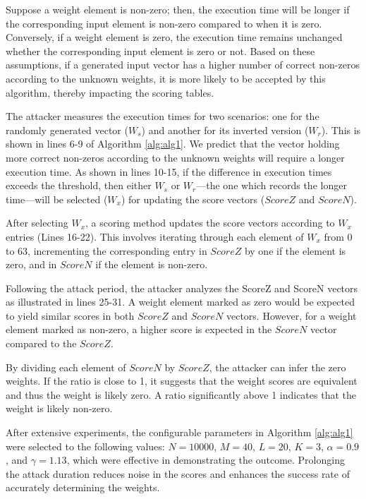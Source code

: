 Suppose a weight element is non-zero; then, the execution time will be longer if the corresponding input element is non-zero compared to when it is zero. Conversely, if a weight element is zero, the execution time remains unchanged whether the corresponding input element is zero or not. Based on these assumptions, if a generated input vector has a higher number of correct non-zeros according to the unknown weights, it is more likely to be accepted by this algorithm, thereby impacting the scoring tables.

The attacker measures the execution times for two scenarios: one for the randomly generated vector (\(W_s\)) and another for its inverted version (\(W_r\)). This is shown in lines 6-9 of Algorithm \ref{alg:alg1}. We predict that the vector holding more correct non-zeros according to the unknown weights will require a longer execution time. As shown in lines 10-15, if the difference in execution times exceeds the threshold, then either \(W_s\) or \(W_r\)—the one which records the longer time—will be selected (\(W_x\)) for updating the score vectors (\(ScoreZ\) and \(ScoreN\)). 

After selecting \(W_x\), a scoring method updates the score vectors according to \(W_x\) entries (Lines 16-22). This involves iterating through each element of \(W_x\) from 0 to 63, incrementing the corresponding entry in \(ScoreZ\) by one if the element is zero, and in \(ScoreN\) if the element is non-zero.

Following the attack period, the attacker analyzes the ScoreZ and ScoreN vectors as illustrated in lines 25-31. A weight element marked as zero would be expected to yield similar scores in both \(ScoreZ\) and \(ScoreN\) vectors. However, for a weight element marked as non-zero, a higher score is expected in the \(ScoreN\) vector compared to the \(ScoreZ\).

By dividing each element of \(ScoreN\) by \(ScoreZ\), the attacker can infer the zero weights. If the ratio is close to 1, it suggests that the weight scores are equivalent and thus the weight is likely zero. A ratio significantly above 1 indicates that the weight is likely non-zero.

After extensive experiments, the configurable parameters in Algorithm \ref{alg:alg1} were selected to the following values: \(N=10000\), \(M=40\), \(L=20\), \(K=3\), \(\alpha=0.9\), and \(\gamma=1.13\), which were effective in demonstrating the outcome. Prolonging the attack duration reduces noise in the scores and enhances the success rate of accurately determining the weights. 



